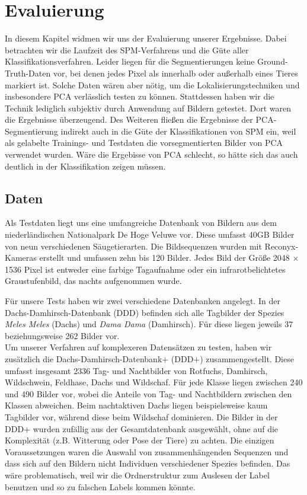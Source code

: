 \section{Evaluierung}
\label{sec:eval}

In diesem Kapitel widmen wir uns der Evaluierung unserer Ergebnisse. Dabei betrachten wir die Laufzeit des SPM-Verfahrens und die Güte aller Klassifikationsverfahren. Leider liegen für die Segmentierungen keine Ground-Truth-Daten vor, bei denen jedes Pixel als innerhalb oder außerhalb eines Tieres markiert ist. Solche Daten wären aber nötig, um die Lokalisierungstechniken und insbesondere PCA verlässlich testen zu können. Stattdessen haben wir die Technik lediglich subjektiv durch Anwendung auf Bildern getestet. Dort waren die Ergebnisse überzeugend. Des Weiteren fließen die Ergebnisse der PCA-Segmentierung indirekt auch in die Güte der Klassifikationen von SPM ein, weil als gelabelte Trainings- und Testdaten die vorsegmentierten Bilder von PCA verwendet wurden. Wäre die Ergebisse von PCA schlecht, so hätte sich das auch deutlich in der Klassifikation zeigen müssen.

\subsection{Daten}

Als Testdaten liegt uns eine umfangreiche Datenbank von Bildern aus dem niederländischen Nationalpark De Hoge Veluwe vor. Diese umfasst 40GB Bilder von neun verschiedenen Säugetierarten. Die Bildsequenzen wurden mit Reconyx-Kameras erstellt und umfassen zehn bis 120 Bilder. Jedes Bild der Größe 2048 $\times$ 1536 Pixel ist entweder eine farbige Tagaufnahme oder ein infrarotbelichtetes Graustufenbild, das nachts aufgenommen wurde.

Für unsere Tests haben wir zwei verschiedene Datenbanken angelegt. In der Dachs-Damhirsch-Datenbank (DDD) befinden sich alle Tagbilder der Spezies \emph{Meles Meles} (Dachs) und \emph{Dama Dama} (Damhirsch). Für diese liegen jeweils 37 beziehungsweise 262 Bilder vor. \\
Um unserer Verfahren auf komplexeren Datensätzen zu testen, haben wir zusätzlich die Dachs-Damhirsch-Datenbank+ (DDD+) zusammengestellt. Diese umfasst insgesamt 2336 Tag- und Nachtbilder von Rotfuchs, Damhirsch, Wildschwein, Feldhase, Dachs und Wildschaf. Für jede Klasse liegen zwischen 240 und 490 Bilder vor, wobei die Anteile von Tag- und Nachtbildern zwischen den Klassen abweichen. Beim nachtaktiven Dachs liegen beispielsweise kaum Tagbilder vor, während diese beim Wildschaf dominieren. Die Bilder in der DDD+ wurden zufällig aus der Gesamtdatenbank ausgewählt, ohne auf die Komplexität (z.B. Witterung oder Pose der Tiere) zu achten. Die einzigen Voraussetzungen waren die Auswahl von zusammenhängenden Sequenzen und dass sich auf den Bildern nicht Individuen verschiedener Spezies befinden. Das wäre problematisch, weil wir die Ordnerstruktur zum Auslesen der Label benutzen und so zu falschen Labels kommen könnte.


